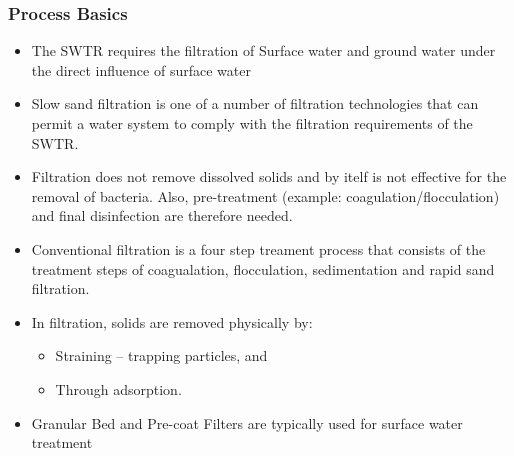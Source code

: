 \subsubsection{Process Basics}
\begin{itemize}
\item The SWTR requires the filtration of Surface water and ground water under the direct influence of surface water 
\item Slow sand filtration is one of a number of filtration technologies that can permit a water system to comply with the filtration requirements of the SWTR.
\item Filtration does not remove dissolved solids and by itelf is not effective for the removal of bacteria. Also, pre-treatment (example: coagulation/flocculation) and final disinfection are therefore needed. 
\item Conventional filtration is a four step treament process that consists of the treatment steps of coagualation, flocculation, sedimentation and rapid sand filtration. 
\item In filtration, solids are removed physically by:
\begin{itemize}
\item Straining – trapping particles, and 
\item Through adsorption.
\end{itemize}
\item Granular Bed and Pre-coat Filters are typically used for surface water treatment


\end{itemize}
